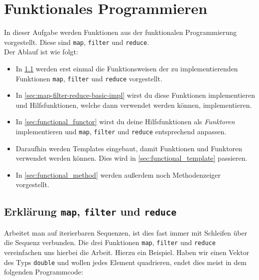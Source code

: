 \section{\ExercisePrefixAdvanced Funktionales Programmieren} %
\label{sec:functional}

In dieser Aufgabe werden Funktionen aus der funktionalen Programmierung vorgestellt.
Diese sind \lstinline{map}, \lstinline{filter} und \lstinline{reduce}. \\

Der Ablauf ist wie folgt:
\begin{itemize}
    \item In \ref{sec:map-filter-reduce-intro} werden erst einmal die Funktionsweisen der zu implementierenden Funktionen \lstinline{map}, \lstinline{filter} und \lstinline{reduce} vorgestellt.
	\item In \ref{sec:map-filter-reduce-basic-impl} wirst du diese Funktionen implementieren und Hilfsfunktionen, welche dann verwendet werden können, implementieren.
	\item In \ref{sec:functional_functor} wirst du deine Hilfsfunktionen als \emph{Funktoren} implementieren und \lstinline{map}, \lstinline{filter} und \lstinline{reduce} entsprechend anpassen.
	\item Daraufhin werden Templates eingebaut, damit Funktionen und Funktoren verwendet werden können. Dies wird in \ref{sec:functional_template} passieren.
	\item In \ref{sec:functional_method} werden außerdem noch Methodenzeiger vorgestellt.
\end{itemize}

\subsection{Erklärung \lstinline{map}, \lstinline{filter} und \lstinline{reduce}}\label{sec:map-filter-reduce-intro}

Arbeitet man auf iterierbaren Sequenzen, ist dies fast immer mit Schleifen über die Sequenz verbunden.
Die drei Funktionen \lstinline{map}, \lstinline{filter} und \lstinline{reduce} vereinfachen uns hierbei die Arbeit.
Hierzu ein Beispiel.
Haben wir einen Vektor des Typs \lstinline{double} und wollen jedes Element quadrieren, endet dies meist in dem folgenden Programmcode:


